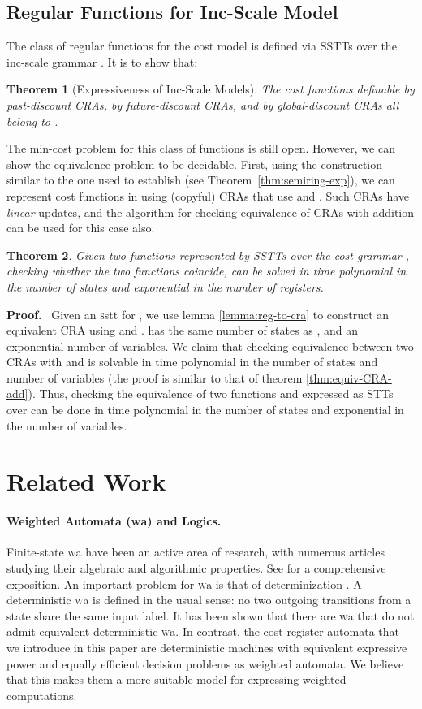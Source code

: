 \documentclass[11pt]{article}
\newtheorem{theorem}{Theorem}
\def\Proof{{\bf Proof.}}
\def\qed{{\bf }}
\newcommand{\mypar}[1]{\subsection{#1}}
\def\qed{{\bf }}
\newcommand{\SSTT}{{\sc\textsc sstt}\xspace}
\newcommand{\WA}{{\sc\textsc wa}\xspace}
\begin{document}
\mypar{Regular Functions for Inc-Scale Model} The class of regular
functions for the cost model  is defined via
SSTTs over the inc-scale grammar . It is to show that:

\begin{theorem}[Expressiveness of Inc-Scale Models]
The cost functions definable by past-discount CRAs, by
future-discount CRAs, and by global-discount CRAs all belong to
.
\end{theorem}

The min-cost problem for this class of functions is still open.
However, we can show the equivalence problem to be decidable. First,
using the construction similar to the one used to establish
 (see
Theorem~\ref{thm:semiring-exp}), we can represent cost functions in
 using (copyful) CRAs that use  and . Such
CRAs have {\em linear\/} updates, and the algorithm for checking
equivalence of CRAs with addition can be used for this case also.
\begin{theorem}
Given two functions  represented by SSTTs
over the cost grammar , checking whether the two
functions coincide, can be solved in time polynomial in the number
of states and exponential in the number of registers.
\end{theorem}
\Proof~
Given an \SSTT  for , we use lemma \ref{lemma:reg-to-cra} to construct an equivalent
CRA  using  and .  has the same number of states as , and an exponential number of variables.
We claim that checking equivalence between two CRAs with  and  is solvable in time polynomial in the number of
states and number of variables (the proof is similar to that of theorem \ref{thm:equiv-CRA-add}). Thus, checking the equivalence
of two functions  and  expressed as STTs over  can be done in time polynomial in the number of
states and exponential in the number of variables. \qed


\section{Related Work}\label{sec:rel}
\paragraph{Weighted Automata (\WA) and Logics.}
Finite-state \WA have been an active area of research, with numerous
articles studying their algebraic and algorithmic properties. See
\cite{droste_handbook_2009} for a comprehensive exposition.  An important
problem for \WA is that of determinization \cite{mohri_weighted_2009,
kirsten_determinization_2005}. A deterministic \WA is defined in the usual
sense: no two outgoing transitions from a state share the same input
label.  It has been shown that there are \WA that do not admit equivalent
deterministic \WA. In contrast, the cost register automata that we
introduce in this paper are deterministic machines with equivalent
expressive power and equally efficient decision problems as weighted
automata. We believe that this makes them a more suitable model for
expressing weighted computations.
\end{document}
